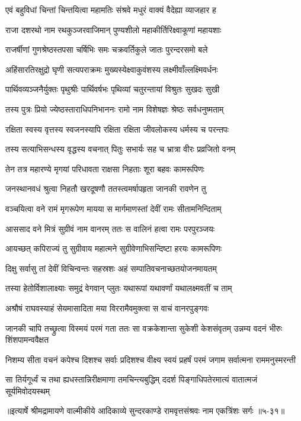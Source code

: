 
\twolineshloka
{एवं बहुविधां चिन्तां चिन्तयित्वा महामतिः}
{संश्रवे मधुरं वाक्यं वैदेह्या व्याजहार ह} %

\twolineshloka
{राजा दशरथो नाम रथकुञ्जरवाजिमान्}
{पुण्यशीलो महाकीर्तिरिक्ष्वाकूणां महायशाः} %

\twolineshloka
{राजर्षीणां गुणश्रेष्ठस्तपसा चर्षिभिः समः}
{चक्रवर्तिकुले जातः पुरन्दरसमो बले} %

\twolineshloka
{अहिंसारतिरक्षुद्रो घृणी सत्यपराक्रमः}
{मुख्यस्येक्ष्वाकुवंशस्य लक्ष्मीवाँल्लक्ष्मिवर्धनः} %

\twolineshloka
{पार्थिवव्यञ्जनैर्युक्तः पृथुश्रीः पार्थिवर्षभः}
{पृथिव्यां चतुरन्तायां विश्रुतः सुखदः सुखी} %

\twolineshloka
{तस्य पुत्रः प्रियो ज्येष्ठस्ताराधिपनिभाननः}
{रामो नाम विशेषज्ञः श्रेष्ठः सर्वधनुष्मताम्} %

\twolineshloka
{रक्षिता स्वस्य वृत्तस्य स्वजनस्यापि रक्षिता}
{रक्षिता जीवलोकस्य धर्मस्य च परन्तपः} %

\twolineshloka
{तस्य सत्याभिसन्धस्य वृद्धस्य वचनात् पितुः}
{सभार्यः सह च भ्रात्रा वीरः प्रव्रजितो वनम्} %

\twolineshloka
{तेन तत्र महारण्ये मृगयां परिधावता}
{राक्षसा निहताः शूरा बहवः कामरूपिणः} %

\twolineshloka
{जनस्थानवधं श्रुत्वा निहतौ खरदूषणौ}
{ततस्त्वमर्षापहृता जानकी रावणेन तु} %

\twolineshloka
{वञ्चयित्वा वने रामं मृगरूपेण मायया}
{स मार्गमाणस्तां देवीं रामः सीतामनिन्दिताम्} %

\twolineshloka
{आससाद वने मित्रं सुग्रीवं नाम वानरम्}
{ततः स वालिनं हत्वा रामः परपुरञ्जयः} %

\twolineshloka
{आयच्छत् कपिराज्यं तु सुग्रीवाय महात्मने}
{सुग्रीवेणाभिसन्दिष्टा हरयः कामरूपिणः} %

\twolineshloka
{दिक्षु सर्वासु तां देवीं विचिन्वन्तः सहस्रशः}
{अहं सम्पातिवचनाच्छतयोजनमायतम्} %

\twolineshloka
{तस्या हेतोर्विशालाक्ष्याः समुद्रं वेगवान् प्लुतः}
{यथारूपां यथावर्णां यथालक्ष्मवतीं च ताम्} %

\twolineshloka
{अश्रौषं राघवस्याहं सेयमासादिता मया}
{विररामैवमुक्त्वा स वाचं वानरपुङ्गवः} %

\threelineshloka
{जानकी चापि तच्छ्रुत्वा विस्मयं परमं गता}
{ततः सा वक्रकेशान्ता सुकेशी केशसंवृतम्}
{उन्नम्य वदनं भीरुः शिंशपामन्ववैक्षत} %

\twolineshloka
{निशम्य सीता वचनं कपेश्च दिशश्च सर्वाः प्रदिशश्च वीक्ष्य}
{स्वयं प्रहर्षं परमं जगाम सर्वात्मना राममनुस्मरन्ती} %

\twolineshloka
{सा तिर्यगूर्ध्वं च तथा ह्यधस्तान्निरीक्षमाणा तमचिन्त्यबुद्धिम्}
{ददर्श पिङ्गाधिपतेरमात्यं वातात्मजं सूर्यमिवोदयस्थम्} %


॥इत्यार्षे श्रीमद्रामायणे वाल्मीकीये आदिकाव्ये सुन्दरकाण्डे रामवृत्तसंश्रवः नाम एकत्रिंशः सर्गः ॥५-३१॥
